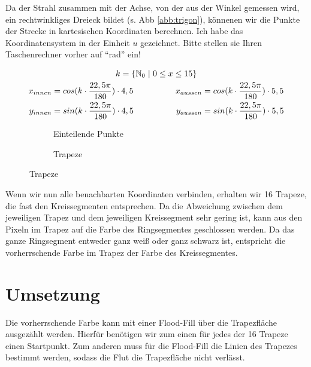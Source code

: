 	Da der Strahl zusammen mit der Achse, von der aus der Winkel gemessen wird, ein rechtwinkliges Dreieck bildet (s. Abb \ref{abb:trigon}), könnenen wir die Punkte der Strecke in kartesischen Koordinaten berechnen. Ich habe das Koordinatensystem in der Einheit \(u\) gezeichnet. Bitte stellen sie Ihren Taschenrechner vorher auf "`rad"' ein!

	\begin{gather}
	k = \{\mathbb{N}_0 \hspace{0.3em}|\hspace{0.3em} 0 \le x \le 15\} \\
	\begin{split}
	x_{innen} &= cos(k \cdot \frac{22,5\pi}{180}) \cdot 4,5 \\
	y_{innen} &= sin(k \cdot \frac{22,5\pi}{180}) \cdot 4,5
	\end{split}
	\hspace{5em}
	\begin{split}
	x_{aussen} &= cos(k \cdot \frac{22,5\pi}{180}) \cdot 5,5 \\
	y_{aussen} &= sin(k \cdot \frac{22,5\pi}{180}) \cdot 5,5
	\end{split}
	\end{gather}

	\begin{figure}[!ht]
		\begin{subfigure}[b]{0.5\textwidth}
			\centering	
			
			\caption{Einteilende Punkte}
		\end{subfigure}
		\begin{subfigure}[b]{0.5\textwidth}
			\centering	
			
			\caption{Trapeze}
		\end{subfigure}
	\end{figure}

	Wenn wir nun alle benachbarten Koordinaten verbinden, erhalten wir 16 Trapeze, die fast den Kreissegmenten entsprechen. Da die Abweichung zwischen dem jeweiligen Trapez und dem jeweiligen Kreissegment sehr gering ist, kann aus den Pixeln im Trapez auf die Farbe des Ringsegmentes geschlossen werden. Da das ganze Ringsegment entweder ganz weiß oder ganz schwarz ist, entspricht die vorherrschende Farbe im Trapez der Farbe des Kreissegmentes.
\section{Umsetzung}
	Die vorherrschende Farbe kann mit einer Flood-Fill über die Trapezfläche ausgezählt werden. Hierfür benötigen wir zum einen für jedes der 16 Trapeze einen Startpunkt. Zum anderen muss für die Flood-Fill die Linien des Trapezes bestimmt werden, sodass die Flut die Trapezfläche nicht verlässt.

